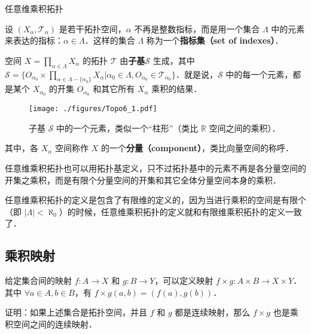 \begin{definition}{任意维乘积拓扑}

设 $(X_\alpha, \mathcal{T}_\alpha)$ 是若干拓扑空间，$\alpha$ 不再是整数指标，而是用一个集合 $\Lambda$ 中的元素来表达的指标：$\alpha\in\Lambda$．这样的集合 $\Lambda$ 称为一个\textbf{指标集（set of indexes）}．

空间 $X=\prod\limits_{\alpha\in\Lambda}X_\alpha$ 的拓扑 $\mathcal{T}$ 由\textbf{子基}$\mathcal{S}$ 生成，其中 $\mathcal{S}=\{O_{\alpha_0}\times\prod\limits_{\alpha\in\Lambda-\{\alpha_0\}}X_\alpha|\alpha_0\in\Lambda, O_{\alpha_0}\in\mathcal{T}_{\alpha_0}\}$．就是说，$\mathcal{S}$ 中的每一个元素，都是某个 $X_{\alpha_0}$ 的开集 $O_{\alpha_0}$ 和其它所有 $X_\alpha$ 乘积的结果．

\begin{figure}[ht]
\centering
\texttt{[image: ./figures/Topo6\_1.pdf]}
\caption{子基 $\mathcal{S}$ 中的一个元素，类似一个“柱形”（类比 $\mathbb{R}$ 空间之间的乘积）．} \label{Topo6_fig1}
\end{figure}

其中，各 $X_\alpha$ 空间称作 $X$ 的一个\textbf{分量（component）}，类比向量空间的称呼．

\end{definition}

任意维乘积拓扑也可以用拓扑基定义，只不过拓扑基中的元素不再是各分量空间的开集之乘积，而是有限个分量空间的开集和其它全体分量空间本身的乘积．

任意维乘积拓扑的定义是包含了有限维的定义的，因为当进行乘积的空间是有限个（即 $|\Lambda|<\aleph_0$）的时候，任意维乘积拓扑的定义就和有限维乘积拓扑的定义一致了．

\subsection{乘积映射}

给定集合间的映射 $f:A\rightarrow X$ 和 $g:B\rightarrow Y$，可以定义映射 $f\times g:A\times B\rightarrow X\times Y$．其中 $\forall a\in A, b\in B$，有 $f\times g(a, b)=(f(a), g(b))$．

\begin{exercise}{}\label{Topo6_exe1}
证明：如果上述集合是拓扑空间，并且 $f$ 和 $g$ 都是连续映射，那么 $f\times g$ 也是乘积空间之间的连续映射．
\end{exercise}



